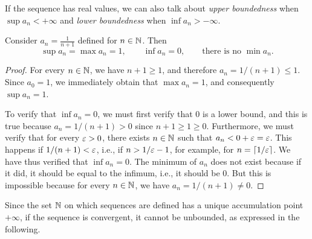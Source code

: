 If the sequence has real values, we can also talk about 
\emph{upper boundedness} when $\sup a_n <+\infty$ 
and \emph{lower boundedness} when $\inf a_n > -\infty$.


\begin{example}
Consider $a_n = \frac{1}{n+1}$ defined for $n\in {\mathbb N}$.
Then
\[
  \sup a_n = \max a_n = 1, \qquad
  \inf a_n = 0, \qquad \text{there is no }\min a_n.
\]
\end{example}
\begin{proof}
For every $n \in {\mathbb N}$, we have $n+1\ge 1$, and therefore $a_n = 1/(n+1) \le 1$.
Since $a_0 = 1$, we immediately obtain that $\max a_n = 1$, and consequently
$\sup a_n = 1$.

To verify that $\inf a_n = 0$, we must first verify that $0$ is a lower bound,
and this is true because $a_n = 1/(n+1)> 0$ since $n+1\ge 1 \ge 0$.
Furthermore, we must verify that for every $\varepsilon >0$, there exists $n\in {\mathbb N}$
such that $a_n < 0 + \varepsilon = \varepsilon$. This happens if $1/(n+1) < \varepsilon$, i.e., if $n
> 1/\varepsilon -1$, for example, for $n=\lceil 1/\varepsilon\rceil$.
We have thus verified that $\inf a_n = 0$.
The minimum of $a_n$ does not exist because if it did, it should be equal to the
infimum, i.e., it should be $0$. But this is impossible because for every $n\in
{\mathbb N}$, we have $a_n = 1/(n+1)\neq 0$.
\end{proof}

Since the set ${\mathbb N}$ on which sequences are defined has a unique accumulation
point $+\infty$, if the sequence is convergent, it cannot be unbounded, as
expressed in the following.

